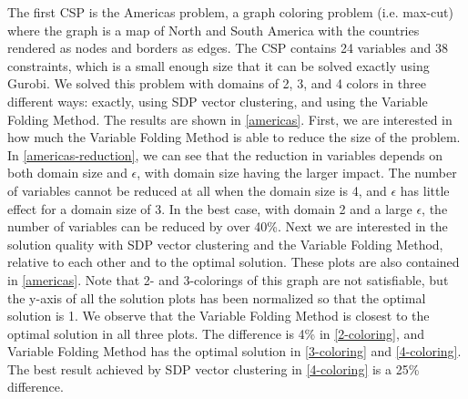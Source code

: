 \documentclass[12pt]{article} %
\begin{document}
The first CSP is the Americas problem, a graph coloring problem (i.e. max-cut) where the graph is a map of North and South America with the countries rendered as nodes and borders as edges. The CSP contains 24 variables and 38 constraints, which is a small enough size that it can be solved exactly using Gurobi. We solved this problem with domains of 2, 3, and 4 colors in three different ways: exactly, using SDP vector clustering, and using the Variable Folding Method. The results are shown in \autoref{americas}. First, we are interested in how much the Variable Folding Method is able to reduce the size of the problem. In \autoref{americas-reduction}, we can see that the reduction in variables depends on both domain size and $\epsilon$, with domain size having the larger impact. The number of variables cannot be reduced at all when the domain size is 4, and $\epsilon$ has little effect for a domain size of 3. In the best case, with domain 2 and a large $\epsilon$, the number of variables can be reduced by over 40\%. Next we are interested in the solution quality with SDP vector clustering and the Variable Folding Method, relative to each other and to the optimal solution. These plots are also contained in \autoref{americas}. Note that 2- and 3-colorings of this graph are not satisfiable, but the y-axis of all the solution plots has been normalized so that the optimal solution is 1. We observe that the Variable Folding Method is closest to the optimal solution in all three plots. The difference is 4\% in \ref{2-coloring}, and Variable Folding Method has the optimal solution in \ref{3-coloring} and \ref{4-coloring}. The best result achieved by SDP vector clustering in \ref{4-coloring} is a 25\% difference.
\end{document}
